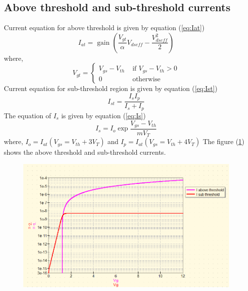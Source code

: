 \documentclass{article}
\begin{document}
\subsection{Above threshold and sub-threshold currents}
Current equation for above threshold is given by equation (\ref{eq:Iat})
\begin{equation}
    \label{eq:Iat}
    I_{at} = \text{ gain } (\frac{V_{gt}}{\alpha} V_{dseff} - \frac{V_{dseff}^2}{2})
\end{equation}
where,
$$V_{gt} = \begin{cases}
    V_{gs} - V_{th} &\text{ if } V_{gs} - V_{th} >0\\
    0 &\text{ otherwise }
\end{cases}$$
Current equation for sub-threshold region is given by equation (\ref{eq:Ist})
\begin{equation}
    \label{eq:Ist}
    I_{st} = \frac{I_{s}I_{p}}{I_{s}+I_{p}}
\end{equation}
The equation of $I_s$ is given by equation (\ref{eq:Is})
\begin{equation}
    \label{eq:Is}
    I_s = I_o \exp{\frac{V_{gs}-V_{th}}{m V_{T}}}
\end{equation}
where, $I_{o} = I_{at}(V_{gs} = V_{th} + 3V_T)$ and $I_{p} = I_{at}(V_{gs} = V_{th} + 4V_T) $
The figure (\ref{fig:at-st}) shows the above threshold and sub-threshold currents. 
\begin{figure}
    \label{fig:at-st}
    \includegraphics[scale = 0.5]{../Images/22072024/Ids-at-st.png}
\end{figure}
\newpage
\end{document}
